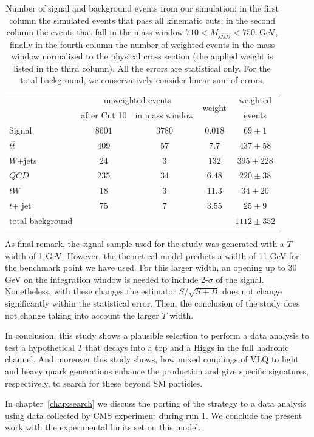 \begin{table}[tb]
\begin{center}
\begin{tabular}{l|c|c|c|c}
 & \multicolumn{2}{c|}{unweighted events}  & \multirow{2}{*}{weight} & weighted  \\
 & after Cut 10 & in mass window & & events \\
 \hline
 Signal & $8601$ & $3780$ & $0.018$ &$69 \pm 1$ \\
 \hline
   $t \bar{t}$ & $409$ & $57$ & $7.7$ & $437 \pm 58$ \\
 $W$+jets & $24$ & $3$ & $132$ & $395 \pm 228$ \\
 $QCD$ & $235$ & $34$ & $6.48$ & $220 \pm 38$ \\
 $tW$ & $18$ & $3$ & $11.3$ & $34 \pm 20$ \\
 $t$+ jet & $75$ & $7$ & $3.55$ & $25 \pm 9$ \\
  \hline
  total background & & & & $1112 \pm 352$ \\
\end{tabular}
\caption{Number of signal and background events from our simulation: in the first column the simulated events that pass all kinematic cuts, in the second column the events that fall in the mass window $710 < M_{jjjjj} < 750$~GeV, finally in the fourth column the number of weighted events in the mass window normalized to the physical cross section (the applied weight is listed in the third column). All the errors are statistical only. For the total background, we conservatively consider linear sum of errors.} \label{tab:events} 
\end{center}
\end{table}

As final remark, the signal sample used for the study was generated with a $T$ width of 1 GeV. However, the theoretical model predicts a width of 11 GeV for the benchmark point we have used. For this larger width, an opening up to 30 GeV on the integration window is needed to include 2-$\sigma$ of the signal. Nonetheless, with these changes the estimator $S/\sqrt{S+B}$ does not change significantly within the statistical error. Then, the conclusion of the study does not change taking into account the larger $T$ width.

In conclusion, this study shows a plausible selection to perform a data analysis to test a hypothetical $T$ that decays into a top and a Higgs in the full hadronic channel. And moreover this study shows, how mixed couplings of VLQ to light and heavy quark generations enhance the production and give specific signatures, respectively, to search for these beyond SM particles. 

In chapter~\ref{chap:search} we discuss the porting of the strategy to a data analysis using data collected by CMS experiment during run 1. We conclude the present work with the experimental limits set on this model.

